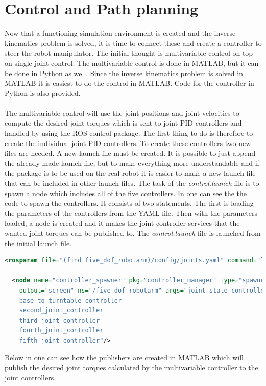 \chapter{Control and Path planning}
Now that a functioning simulation environment is created and the inverse kinematics problem is solved, it is time to connect these and create a controller to steer the robot manipulator. The initial thought is multivariable control on top on single joint control. The multivariable control is done in MATLAB, but it can be done in Python as well. Since the inverse kinematics problem is solved in MATLAB it is easiest to do the control in MATLAB. Code for the controller in Python is also provided. \\\\
The multivariable control will use the joint positions and joint velocities to compute the desired joint torques which is sent to joint PID controllers and handled by using the ROS control package\cite{ROScontrol}. The first thing to do is therefore to create the individual joint PID controllers. To create these controllers two new files are needed. A new launch file must be created. It is possible to just append the already made launch file, but to make everything more understandable and if the package is to be used on the real robot it is easier to make a new launch file that can be included in other launch files. The task of the \textit{control.launch} file is to spawn a node which includes all of the five controllers. In  one can see the the code to spawn the controllers. It consists of two statements. The first is loading the parameters of the controllers from the YAML file. Then with the parameters loaded, a node is created and it makes the joint controller services that the wanted joint torques can be published to. The \textit{control.launch} file is launched from the initial launch file.
\begin{lstlisting}[language=xml,caption={Spawns the controller node},label={lst:launchControl}]
<rosparam file="(find five_dof_robotarm)/config/joints.yaml" command="load"/>

  <node name="controller_spawner" pkg="controller_manager" type="spawner" respawn="false"
	output="screen" ns="/five_dof_robotarm" args="joint_state_controller
    base_to_turntable_controller
    second_joint_controller
    third_joint_controller
    fourth_joint_controller
    fifth_joint_controller"/>
\end{lstlisting}
Below in  one can see how the publishers are created in MATLAB which will publish the desired joint torques calculated by the multivariable controller to the joint controllers.
